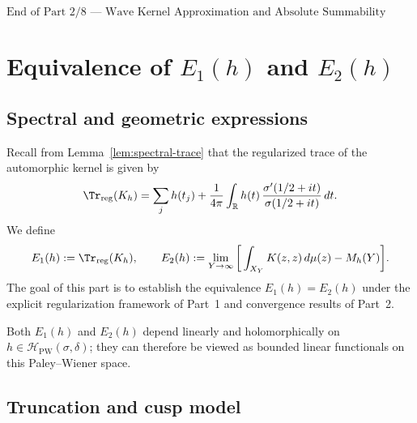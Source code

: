 \begin{center}
\(\boxed{\text{End of Part 2/8 — Wave Kernel Approximation and Absolute Summability}}\)
\end{center}


\section{Equivalence of \(E_1(h)\) and \(E_2(h)\)}
\label{sec:ch4-part3-equivalenceE1E2} \relax \hspace{0pt}

\subsection{Spectral and geometric expressions}
\label{subsec:ch4-part3-spectral-geo}
\relax

Recall from Lemma~\ref{lem:spectral-trace} that the regularized trace of the automorphic kernel is given by
\[
\Tr_{\mathrm{reg}}(K_h)
= \sum_j h(t_j)
+ \frac{1}{4\pi}\int_{\mathbb{R}} h(t)\,\frac{\sigma'(1/2+it)}{\sigma(1/2+it)}\,dt.
\]
We define
\[
E_1(h) := \Tr_{\mathrm{reg}}(K_h), \qquad
E_2(h) := \lim_{Y\to\infty} \bigg[\int_{X_Y} K(z,z)\,d\mu(z) - M_h(Y)\bigg].
\]
The goal of this part is to establish the equivalence \(E_1(h)=E_2(h)\) under the explicit regularization framework of Part~1 and convergence results of Part~2.

\begin{remark}
Both $E_1(h)$ and $E_2(h)$ depend linearly and holomorphically on $h\in\mathcal{H}_{\mathrm{PW}}(\sigma,\delta)$; they can therefore be viewed as bounded linear functionals on this Paley–Wiener space.
\end{remark}

\subsection{Truncation and cusp model}
\label{subsec:ch4-part3-truncation}
\relax

